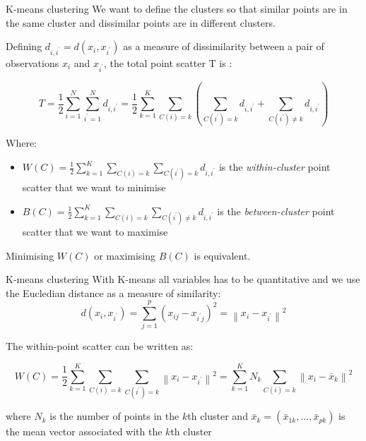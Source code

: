 \documentclass[notes]{beamer}          %
\newcommand{\norm}[1]{\left\lVert#1\right\rVert}
\providecommand{\norm}[1]{\lVert#1\rVert}
\begin{document}
\begin{frame}{K-means clustering}
We want to define the clusters so that similar points are in the same cluster and dissimilar points are in different clusters.

Defining $d_{i, i^\prime}=d(x_i, x_{i^\prime})$ as a measure of dissimilarity between a pair of observations $x_i$ and $x_{i^\prime}$, the total point scatter T is :

\begin{equation*}
	T = \frac{1}{2}  \sum_{i=1}^N \sum_{i^\prime=1}^N d_{i, i^\prime} = \frac{1}{2}  \sum_{k=1}^K \sum_{C(i)=k} (\sum_{C(i^\prime)=k} d_{i, i^\prime}  + \sum_{C(i^\prime) \neq k} d_{i, i^\prime})
\end{equation*}

Where:
\begin{itemize}
 \item $W(C) = \frac{1}{2} \sum_{k=1}^K \sum_{C(i)=k} \sum_{C(i^\prime)=k} d_{i, i^\prime}$ is the \textit{within-cluster} point scatter that we want to minimise
 \item $B(C) = \frac{1}{2} \sum_{k=1}^K \sum_{C(i)=k} \sum_{C(i^\prime) \neq k} d_{i, i^\prime}$ is the \textit{between-cluster} point scatter that we want to maximise
\end{itemize}

Minimising $W(C)$ or maximising $B(C)$ is equivalent.
\end{frame}

\begin{frame}{K-means clustering}
With K-means all variables has to be quantitative and we use the Eucledian distance as a measure of similarity:
\begin{equation*}
	d(x_i, x_{i^\prime}) = \sum_{j=1}^p (x_{ij} - x_{i^\prime j})^2 = \norm{x_{i} - x_{i^\prime} }^2
\end{equation*}

The within-point scatter can be written as:

\begin{equation*}
	W(C) = \frac{1}{2} \sum_{k=1}^K \sum_{C(i)=k} \sum_{C(i^\prime)=k} \norm{x_{i} - x_{i^\prime} }^2 = \sum_{k=1}^K N_k \sum_{C(i)=k}  \norm{x_{i} - \bar{x}_k }^2
\end{equation*}

where $N_k$ is the number of points in the $k$th cluster and $\bar{x}_k = (\bar{x}_{1k}, \dots, \bar{x}_{pk})$ is the mean vector associated with the $k$th cluster
\end{frame}
\end{document}
